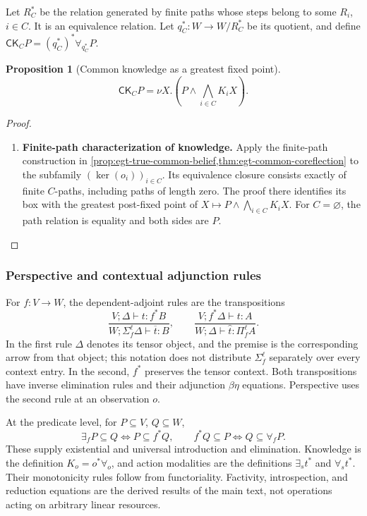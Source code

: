 \documentclass[11pt,a4paper]{article}
\numberwithin{equation}{section}
\newtheorem{proposition}[theorem]{Proposition}
\theoremstyle{definition}
\theoremstyle{remark}
\theoremstyle{plain}
\providecommand{\CK}{\mathsf{CK}}
\begin{document}
Let $R_C^*$ be the relation generated by finite paths whose steps belong
to some $R_i$, $i\in C$. It is an equivalence relation. Let
$q_C^*:W\to W/R_C^*$ be its quotient, and define
$\CK_CP=(q_C^*)^*\forall_{q_C^*}P$.

\begin{proposition}[Common knowledge as a greatest fixed point]
\label{agt-prop-common}
\[
 \CK_CP=\nu X.\left(P\wedge\bigwedge_{i\in C}K_iX\right).
\]
\end{proposition}
\begin{proof}
\leavevmode
\begin{enumerate}[label=\textup{(\arabic*)},leftmargin=*,itemsep=4pt,topsep=3pt]
  \item \textbf{Finite-path characterization of knowledge.} Apply the finite-path construction in
\cref{prop:egt-true-common-belief,thm:egt-common-coreflection} to the
subfamily $(\ker(o_i))_{i\in C}$. Its equivalence closure consists
exactly of finite $C$-paths, including paths of length zero. The proof there identifies its box with the greatest post-fixed point
of $X\mapsto P\wedge\bigwedge_{i\in C}K_iX$. For $C=\varnothing$, the path relation is equality and both sides are $P$.
\end{enumerate}
\end{proof}

\subsubsection{Perspective and contextual adjunction rules}

For $f:V\to W$, the dependent-adjoint rules are the transpositions
\[
 \frac{V;\Delta\vdash t:f^*B}{W;\Sigma_f^\ell\Delta\vdash\overline t:B},
 \qquad
 \frac{V;f^*\Delta\vdash t:A}{W;\Delta\vdash\widehat t:\Pi_f^\ell A}.
\]
In the first rule $\Delta$ denotes its tensor object, and the premise is
the corresponding arrow from that object; this notation does not distribute
$\Sigma_f^\ell$ separately over every context entry. In the second,
$f^*$ preserves the tensor context. Both transpositions have inverse
elimination rules and their adjunction $\beta\eta$ equations.
Perspective uses the second rule at an observation $o$.

At the predicate level, for $P\subseteq V$, $Q\subseteq W$,
\[
 \exists_fP\subseteq Q\iff P\subseteq f^*Q,
 \qquad f^*Q\subseteq P\iff Q\subseteq\forall_fP.
\]
These supply existential and universal introduction and elimination.
Knowledge is the definition $K_o=o^*\forall_o$, and action modalities
are the definitions $\exists_s t^*$ and $\forall_s t^*$.
Their monotonicity rules follow from functoriality. Factivity,
introspection, and reduction equations are the derived results of the
main text, not operations acting on arbitrary linear resources.
\end{document}
